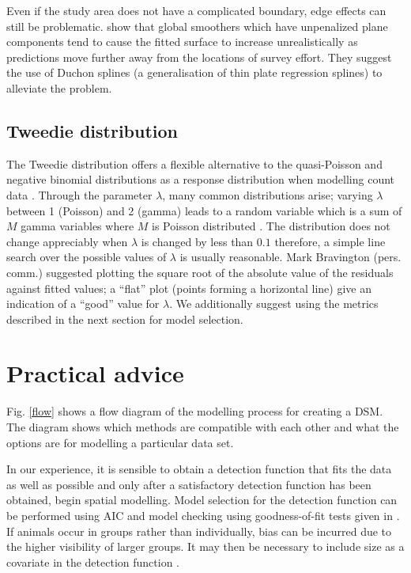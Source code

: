 \documentclass[a4paper,12pt]{article}
\begin{document}
Even if the study area does not have a complicated boundary, edge effects can still be problematic. \cite{Miller:wx} show that global smoothers which have unpenalized plane components tend to cause the fitted surface to increase unrealistically as predictions move further away from the locations of survey effort. They suggest the use of Duchon splines (a generalisation of thin plate regression splines) to alleviate the problem.

\subsection*{Tweedie distribution}
\label{s:Tweedie}

The Tweedie distribution offers a flexible alternative to the quasi-Poisson and negative binomial distributions as a response distribution when modelling count data \citep{Candy:2004tb}. Through the parameter $\lambda$, many common distributions arise; varying $\lambda$ between 1 (Poisson) and 2 (gamma) leads to a random variable which is a sum of $M$ gamma variables where $M$ is Poisson distributed \citep{Jorgensen:1987vg}. The distribution does not change appreciably when $\lambda$ is changed by less than $0.1$ therefore, a simple line search over the possible values of $\lambda$ is usually reasonable. Mark Bravington (pers. comm.) suggested plotting the square root of the absolute value of the residuals against fitted values; a ``flat'' plot (points forming a horizontal line) give an indication of a ``good'' value for $\lambda$. We additionally suggest using the metrics described in the next section for model selection.


\section*{Practical advice}
\label{s:practical}

Fig. \ref{flow} shows a flow diagram of the modelling process for creating a DSM. The diagram shows which methods are compatible with each other and what the options are for modelling a particular data set.

In our experience, it is sensible to obtain a detection function that fits the data as well as possible and only after a satisfactory detection function has been obtained, begin spatial modelling. Model selection for the detection function can be performed using AIC and model checking using goodness-of-fit tests given in \cite[Section 11.11]{burnham:2004vd}.  If animals occur in groups rather than individually, bias can be incurred due to the higher visibility of larger groups. It may then be necessary to include size as a covariate in the detection function \citep[see][Section 4.8.2.4]{Buckland:2001vm}.
\end{document}
